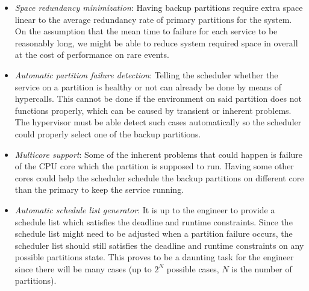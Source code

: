 \documentclass[conference]{IEEEtran}
\begin{document}
\begin{itemize}

	\item \textit{Space redundancy minimization}: Having backup partitions require extra
		space linear to the average redundancy rate of primary partitions for the
		system. On the assumption that the mean time to failure for each service to be
		reasonably long, we might be able to reduce system required space in overall at
		the cost of performance on rare events.

	\item \textit{Automatic partition failure detection}: Telling the scheduler whether the
		service on a partition is healthy or not can already be done by means of
		hypercalls. This cannot be done if the environment on said partition does not
		functions properly, which can be caused by transient or inherent problems. The
		hypervisor must be able detect such cases automatically so the scheduler could
		properly select one of the backup partitions.

	\item \textit{Multicore support}: Some of the inherent problems that could happen is
		failure of the CPU core which the partition is supposed to run.
		Having some other cores could help the scheduler schedule the backup partitions
		on different core than the primary to keep the service running.

		\newpage

	\item \textit{Automatic schedule list generator}: It is up to the engineer to provide a
		schedule list which satisfies the deadline and runtime constraints. Since the
		schedule list might need to be adjusted when a partition failure occurs, the
		scheduler list should still satisfies the deadline and runtime constraints on
		any possible partitions state. This proves to be a daunting task for the
		engineer since there will be many cases (up to $2^N$ possible cases, $N$ is the
		number of partitions).

\end{itemize}




\ifCLASSOPTIONcompsoc
\else
\fi
\end{document}
